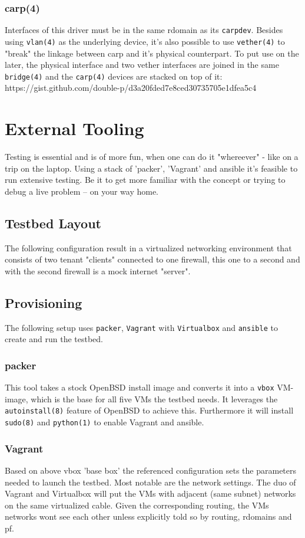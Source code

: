 \documentclass[letterpaper,twocolumn,10pt]{article}
\begin{document}
\subsubsection{carp(4)}
Interfaces of this driver must be in the same rdomain as its {\tt carpdev}. Besides using {\tt vlan(4)} as the underlying device, it's also possible to use {\tt vether(4)} to "break" the linkage between carp and it's physical counterpart. To put use on the later, the physical interface and two vether interfaces are joined in the same {\tt bridge(4)} and the {\tt carp(4)} devices are stacked on top of it: https://gist.github.com/double-p/d3a20fded7e8ced30735705e1dfea5c4



\section{External Tooling}
Testing is essential and is of more fun, when one can do it "whereever" - like on a trip on the laptop.
Using a stack of 'packer', 'Vagrant' and ansible it's feasible to run extensive testing. Be it to get more familiar with the concept or trying to debug a live problem -- on your way home.

\subsection{Testbed Layout}
The following configuration result in a virtualized networking environment that consists of two tenant "clients" connected to one firewall, this one to a second and with the second firewall is a mock internet "server".

\subsection{Provisioning}
The following setup uses {\tt packer}, {\tt Vagrant} with {\tt Virtualbox} and {\tt ansible} to create and run the testbed.

\subsubsection{packer}
This tool takes a stock OpenBSD install image and converts it into a {\tt vbox} VM-image, which is the base for all five VMs the testbed needs. It leverages the {\tt autoinstall(8)} feature of OpenBSD to achieve this. Furthermore it will install {\tt sudo(8)} and {\tt python(1)} to enable Vagrant and ansible.

\subsubsection{Vagrant}
Based on above vbox 'base box' the referenced configuration sets the parameters needed to launch the testbed. Most notable are the network settings. The duo of Vagrant and Virtualbox will put the VMs with adjacent (same subnet) networks on the same virtualized cable. Given the corresponding routing, the VMs networks wont see each other unless explicitly told so by routing, rdomains and pf.
\end{document}

